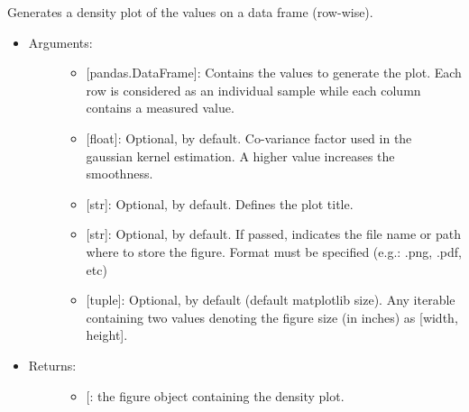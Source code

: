 \documentclass[letterpaper,10pt,english]{sphinxmanual}
\begin{document}
\begin{fulllineitems}
\label{\detokenize{plots:data_tools.plots.density}}
Generates a density plot of the values on a data frame (row-wise).
\begin{itemize}
\item {} \begin{description}
\item[{Arguments:}] \leavevmode\begin{itemize}
\item {} 
 {[}pandas.DataFrame{]}: Contains the values to generate the
plot. Each row is considered as an individual sample while
each column contains a measured value.

\item {} 
 {[}float{]}: Optional,  by default. Co-variance
factor used in the gaussian kernel estimation. A higher value
increases the smoothness.

\item {} 
 {[}str{]}: Optional,  by default. Defines the plot
title.

\item {} 
 {[}str{]}: Optional,  by default. If passed,
indicates the file name or path where to store the figure.
Format must be specified (e.g.: .png, .pdf, etc)

\item {} 
 {[}tuple{]}: Optional,  by default (default
matplotlib size). Any iterable containing two values denoting
the figure size (in inches) as {[}width, height{]}.

\end{itemize}

\end{description}

\item {} \begin{description}
\item[{Returns:}] \leavevmode\begin{itemize}
\item {} 
{[}\sphinxstyleemphasis{matplotlib.figure.Figure}{]}: the figure object containing the
density plot.

\end{itemize}

\end{description}

\end{itemize}

\end{fulllineitems}
\end{document}
